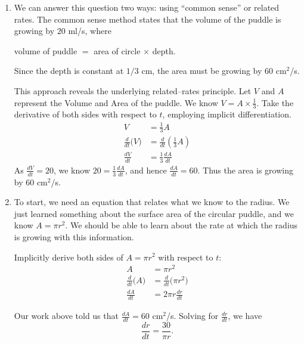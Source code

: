 {\begin{enumerate}
\item We can answer this question two ways: using ``common sense'' or related rates. The common sense method states that the volume of the puddle is growing by $20$ ml/s, where 
	\begin{center} volume of puddle $=$ area of circle $\times$ depth.\end{center}
Since the depth is constant at $1/3$ cm, the area must be growing by 60 cm$^2$/s.

This approach reveals the underlying related--rates principle. Let $V$ and $A$ represent the Volume and Area of the puddle. We know $V= A\times \frac13$. Take the derivative of both sides with respect to $t$, employing implicit differentiation.
\begin{align*}
V &= \frac13A\\
\frac{d}{dt}\big(V\big) &= \frac{d}{dt}\left(\frac13A\right)\\
\frac{dV}{dt} &=	\frac13\frac{dA}{dt}
\end{align*} 
As $\frac{dV}{dt} = 20$, we know $20 = \frac13\frac{dA}{dt}$, and hence $\frac{dA}{dt} = 60$. Thus the area is growing by 60 cm$^2$/s.

\drawexampleline
\item		To start, we need an equation that relates what we know to the radius. We just learned something about the surface area of the circular puddle, and we know $A = \pi r^2$. We should be able to learn about the rate at which the radius is growing with this information. 

Implicitly derive both sides of $A=\pi r^2$ with respect to $t$:
\begin{align*}
	A 	&= \pi r^2 \\
	\frac{d}{dt}\big(A\big) &= \frac{d}{dt}\big(\pi r^2\big)\\
	\frac{dA}{dt} &= 2\pi r\frac{dr}{dt}
\end{align*}

Our work above told us that $\frac{dA}{dt} = 60$ cm$^2$/s. Solving for $\frac{dr}{dt}$, we have 
\[
\frac{dr}{dt} = \frac{30}{\pi r}.
\]


\end{enumerate}}
